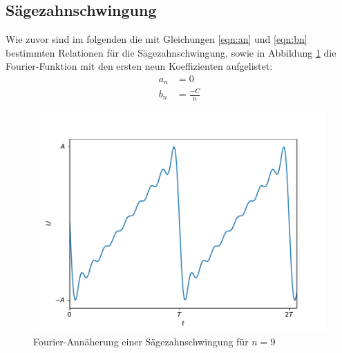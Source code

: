 \subsection{Sägezahnschwingung}
Wie zuvor sind im folgenden die mit Gleichungen \eqref{eqn:an} und \eqref{eqn:bn} bestimmten Relationen für die Sägezahnschwingung, sowie in Abbildung \ref{fig:vorbereitung_sägezahn} die Fourier-Funktion mit den ersten neun Koeffizienten aufgelistet:
\begin{align*}
    a_n &= 0 \\
    b_n &= \frac{-C}{n}
\end{align*}
\begin{figure}[h]
  \centering
  \includegraphics[width=\textwidth]{assets/fourier_zahn.pdf}
  \caption{Fourier-Annäherung einer Sägezahnschwingung für $n=9$}
  \label{fig:vorbereitung_sägezahn}
\end{figure}
